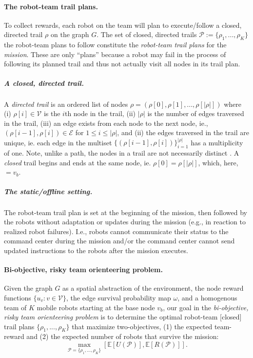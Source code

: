 \documentclass[11pt, oneside]{article}
\begin{document}
\paragraph{The robot-team trail plans.}
To collect rewards, each robot on the team will plan to execute/follow a closed, directed trail $\rho$ on the graph $G$.  
The set of closed, directed trails $\mathcal{P}:=\{\rho_1, ..., \rho_K\}$ the robot-team plans to follow constitute the \emph{robot-team trail plans} for the \emph{mission}. These are only ``plans'' because a robot may fail in the process of following its planned trail and thus not actually visit all nodes in its trail plan.

\vspace{-\baselineskip}
\subparagraph{A closed, directed trail.} 
A \emph{directed trail} is an ordered list of nodes $\rho = (\rho[0], \rho[1], ..., \rho[\lvert \rho \rvert])$ where
(i) $\rho[i] \in \mathcal{V}$ is the $i$th node in the trail,  
(ii) $\lvert \rho \rvert$ is the number of edges traversed in the trail,
(iii) an edge exists from each node to the next node, ie., $(\rho[i-1], \rho[i])\in\mathcal{E}$ for $1 \leq i  \leq \lvert \rho \rvert$,
and 
(ii) the edges traversed in the trail are unique, ie. each edge in the multiset $\{(\rho[i-1], \rho[i])\}_{i=1}^{\lvert \rho \rvert}$ has a multiplicity of one.
Note, unlike a path, the nodes in a trail are not necessarily distinct \cite{wilson1979introduction}.
A \emph{closed} trail begins and ends at the same node, ie. $\rho [0]=\rho[\lvert \rho \rvert]$, which, here, $=v_b$.

\vspace{-\baselineskip}
\subparagraph{The static/offline setting.} 
The robot-team trail plan is set at the beginning of the mission, then followed by the robots without adaptation or updates during the mission (e.g., in reaction to realized robot failures). 
I.e., robots cannot communicate their status to the command center during the mission and/or the command center cannot send updated instructions to the robots after the mission executes.

\paragraph{Bi-objective, risky team orienteering problem.}
Given the graph $G$ as a spatial abstraction of the environment, the node reward functions $\{u_v : v \in\mathcal{V}\}$, the edge survival probability map $\omega$, and a homogenous team of $K$ mobile robots starting at the base node $v_b$, our goal in the \emph{bi-objective, risky team orienteering problem} is to determine the optimal robot-team [closed] trail plans $\{\rho_1, ..., \rho_K\}$ that maximize two-objectives, (1) the expected team-reward and (2) the expected number of robots that survive the mission:
\begin{equation}
\max_{\mathcal{P}=\{\rho_1, ..., \rho_K\}} [\mathbb{E}[U(\mathcal{P})], \mathbb{E}[R(\mathcal{P})]].
\label{eq:the_two_objs}
\end{equation}
\end{document}
